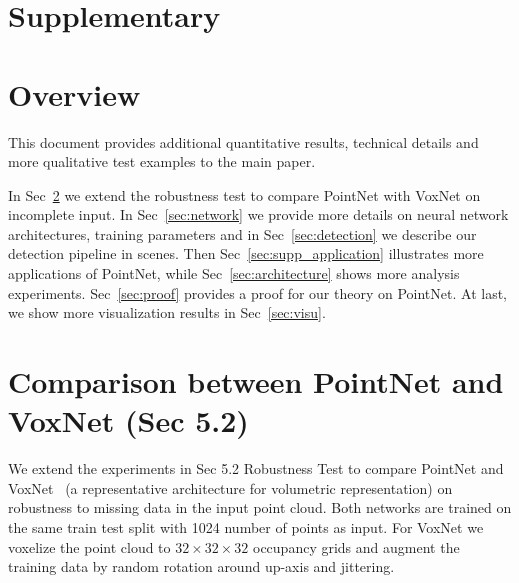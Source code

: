 \appendix
\section*{Supplementary}

\section{Overview}
This document provides additional quantitative results, technical details and more qualitative test examples to the main paper.

In Sec~\ref{sec:cla_robust} we extend the robustness test to compare PointNet with VoxNet on incomplete input. In Sec~\ref{sec:network} we provide more details on neural network architectures, training parameters and in Sec~\ref{sec:detection} we describe our detection pipeline in scenes. Then Sec~\ref{sec:supp_application} illustrates more applications of PointNet, while Sec~\ref{sec:architecture} shows more analysis experiments. Sec~\ref{sec:proof} provides a proof for our theory on PointNet. At last, we show more visualization results in Sec~\ref{sec:visu}.


\section{Comparison between PointNet and VoxNet (Sec 5.2)}
\label{sec:cla_robust}
We extend the experiments in Sec 5.2 Robustness Test to compare PointNet and VoxNet~\cite{maturana2015voxnet} (a representative architecture for volumetric representation) on robustness to missing data in the input point cloud. Both networks are trained on the same train test split with 1024 number of points as input. For VoxNet we voxelize the point cloud to $32 \times 32 \times 32$ occupancy grids and augment the training data by random rotation around up-axis and jittering.

